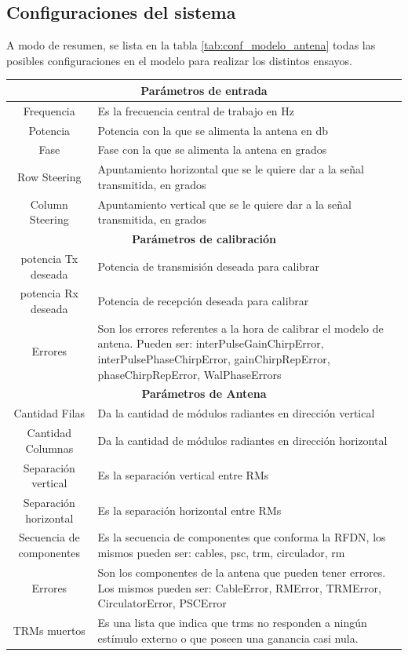 \subsection{Configuraciones del sistema}

A modo de resumen, se lista en la tabla \ref{tab:conf_modelo_antena} todas las posibles configuraciones en el modelo para 
realizar los distintos ensayos.

\begin{center}
  \footnotesize
  \centering
  \begin{longtable}{|c|p{9cm}|}
    \hline 
	\multicolumn{2}{|c|}{\textbf{Parámetros de entrada}} \\ 
	\hline
    Frequencia		& Es la frecuencia central de trabajo en Hz \tabularnewline \hline 
    Potencia		& Potencia con la que se alimenta la antena en db \tabularnewline \hline 
    Fase			& Fase con la que se alimenta la antena en grados \tabularnewline \hline 
    Row Steering	& Apuntamiento horizontal que se le quiere dar a la señal transmitida, en grados  \tabularnewline \hline 
    Column Steering	& Apuntamiento vertical que se le quiere dar a la señal transmitida, en grados  \tabularnewline \hline 
	\multicolumn{2}{|c|}{\textbf{Parámetros de calibración}} \\ 
	\hline
	potencia Tx deseada	& Potencia de transmisión deseada para calibrar  \tabularnewline \hline 
	potencia Rx deseada	& Potencia de recepción deseada para calibrar  \tabularnewline \hline 
	Errores	& Son los errores referentes a la hora de calibrar el modelo de antena. Pueden ser: interPulseGainChirpError, 
	interPulsePhaseChirpError, gainChirpRepError, phaseChirpRepError, WalPhaseErrors  \tabularnewline \hline
	\multicolumn{2}{|c|}{\textbf{Parámetros de Antena}} \\ 
	\hline
	Cantidad Filas	& Da la cantidad de módulos radiantes en dirección vertical \tabularnewline \hline 
	Cantidad Columnas	& Da la cantidad de módulos radiantes en dirección horizontal \tabularnewline \hline 
	Separación vertical & Es la separación vertical entre RMs \tabularnewline \hline 
	Separación horizontal & Es la separación horizontal entre RMs \tabularnewline \hline 
	Secuencia de componentes & Es la secuencia de componentes que conforma la RFDN, los mismos pueden ser: cables, psc, trm, circulador, rm \tabularnewline \hline 
	Errores  & Son los componentes de la antena que pueden tener errores. Los mismos pueden ser: CableError, RMError, TRMError, CirculatorError, PSCError 
	\tabularnewline \hline 
	TRMs muertos & Es una lista que indica que trms no responden a ningún estímulo externo o que poseen una ganancia casi nula. \tabularnewline \hline 

\end{longtable}
\end{center}

